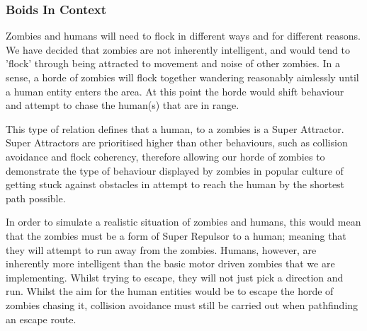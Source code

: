 \subsubsection{Boids In Context}
Zombies and humans will need to flock in different ways and for different reasons. We have decided that zombies are not inherently intelligent, and would tend to 'flock' through being attracted to movement and noise of other zombies. In a sense, a horde of zombies will flock together wandering reasonably aimlessly until a human entity enters the area. At this point the horde would shift behaviour and attempt to chase the human(s) that are in range.

This type of relation defines that a human, to a zombies is a Super Attractor. Super Attractors are prioritised higher than other behaviours, such as collision avoidance and flock coherency, therefore allowing our horde of zombies to demonstrate the type of behaviour displayed by zombies in popular culture of getting stuck against obstacles in attempt to reach the human by the shortest path possible.

In order to simulate a realistic situation of zombies and humans, this would mean that the zombies must be a form of Super Repulsor to a human; meaning that they will attempt to run away from the zombies. Humans, however, are inherently more intelligent than the basic motor driven zombies that we are implementing. Whilst trying to escape, they will not just pick a direction and run. Whilst the aim for the human entities would be to escape the horde of zombies chasing it, collision avoidance must still be carried out when pathfinding an escape route.

\clearpage
\endinput
